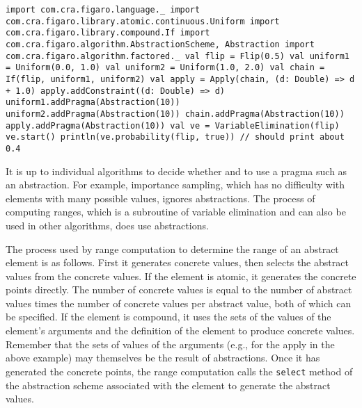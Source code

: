 \begin{flushleft}
\texttt{import com.cra.figaro.language.\_
\newline import com.cra.figaro.library.atomic.continuous.Uniform
\newline import com.cra.figaro.library.compound.If
\newline import com.cra.figaro.algorithm.{AbstractionScheme, Abstraction}
\newline import com.cra.figaro.algorithm.factored.\_
\newline 
\newline val flip = Flip(0.5)
\newline val uniform1 = Uniform(0.0, 1.0)
\newline val uniform2 = Uniform(1.0, 2.0)
\newline val chain = If(flip, uniform1, uniform2)
\newline val apply = Apply(chain, (d: Double) => d + 1.0)
\newline apply.addConstraint((d: Double) => d)
\newline 
\newline uniform1.addPragma(Abstraction(10)) 
\newline uniform2.addPragma(Abstraction(10)) 
\newline chain.addPragma(Abstraction(10)) 
\newline apply.addPragma(Abstraction(10))
\newline 
\newline val ve = VariableElimination(flip)
\newline ve.start()
\newline println(ve.probability(flip, true)) // should print about 0.4 }
\end{flushleft}

It is up to individual algorithms to decide whether and to use a pragma such as an abstraction. For example, importance sampling, which has no difficulty with elements with many possible values, ignores abstractions. The process of computing ranges, which is a subroutine of variable elimination and can also be used in other algorithms, does use abstractions.

The process used by range computation to determine the range of an abstract element is as follows. First it generates concrete values, then selects the abstract values from the concrete values. If the element is atomic, it generates the concrete points directly. The number of concrete values is equal to the number of abstract values times the number of concrete values per abstract value, both of which can be specified. If the element is compound, it uses the sets of the values of the element's arguments and the definition of the element to produce concrete values. Remember that the sets of values of the arguments (e.g., for the apply in the above example) may themselves be the result of abstractions. Once it has generated the concrete points, the range computation calls the \texttt{select} method of the abstraction scheme associated with the element to generate the abstract values.

